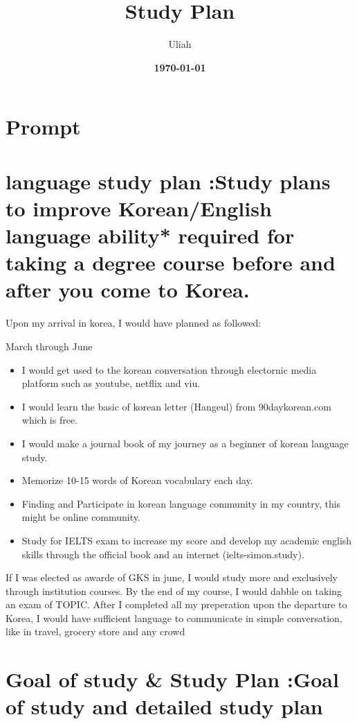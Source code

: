 \documentclass[12pt]{simart} %
\title{
\textbf{ Study Plan} \\
} %
\date{\textbf{\today}}
\author{Uliah}
\begin{document}
\maketitle
\section{Prompt}

\section{language study plan :Study plans to improve Korean/English language ability* required for taking a degree course before and after you come to Korea.}

Upon my arrival in korea, I would have planned as followed:

March through June
\begin{itemize}
    \item I would get used to the korean conversation through electornic media platform such as youtube, netflix and viu.
    \item I would learn the basic of korean letter (Hangeul) from 90daykorean.com which is free.
    \item I would make a journal book of my journey as a beginner of korean language study.
    \item Memorize 10-15 words of Korean vocabulary each day.
    \item Finding and Participate in korean language community in my country, this might be online community.
    \item Study for IELTS exam to increase my score and develop my academic english skills through the official book and an internet (ielts-simon.study).
\end{itemize}

If I was elected as awarde of GKS in june, I would study more and exclusively through institution courses. By the end of my course, I would dabble on taking an exam of TOPIC. After I completed all my preperation  upon the departure to Korea, I would have sufficient language to communicate in simple conversation, like in travel, grocery store and any crowd






\section{Goal of study \& Study Plan :Goal of study and detailed study plan}
\end{document}

